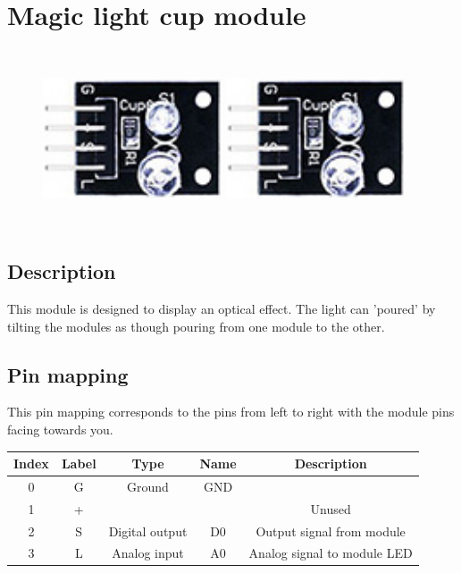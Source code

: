 \section{Magic light cup module}
\begin{figure}[H]
    \centering
    \includegraphics[angle=0, keepaspectratio=true, scale=1, width=200px, height=200px]{images/magic_cup.jpg}
    \includegraphics[angle=0, keepaspectratio=true, scale=1, width=200px, height=200px]{images/magic_cup.jpg}
\end{figure}
\subsection*{Description}
This module is designed to display an optical effect. The light can 'poured' by tilting the modules as though pouring from one module to the other.

\subsection*{Pin mapping}
This pin mapping corresponds to the pins from left to right with the module pins facing towards you.
\begin{table}[H]
    \centering
    \begin{tabular}{|c|c|c|c|c|}
    \hline
    Index &Label &Type &Name &Description\\ \hline
    0 &G &Ground &GND &\\ \hline
    1 &+ & & &Unused \\ \hline
    2 &S &Digital output &D0 &Output signal from module\\ \hline
    3 &L &Analog input &A0 &Analog signal to module LED\\ \hline
    \end{tabular}
\end{table}

